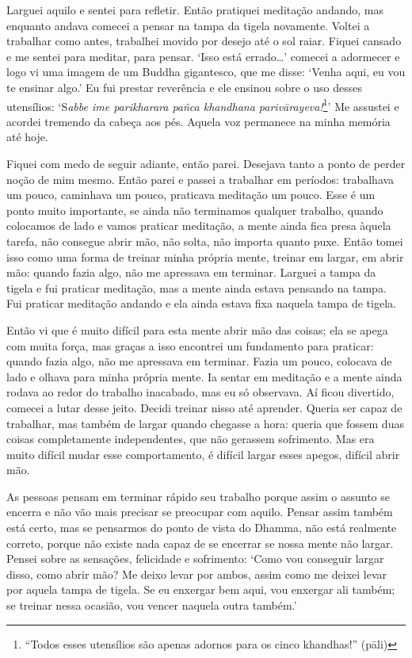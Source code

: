 Larguei aquilo e sentei para refletir. Então pratiquei meditação
andando, mas enquanto andava comecei a pensar na tampa da tigela
novamente. Voltei a trabalhar como antes, trabalhei movido por desejo
até o sol raiar. Fiquei cansado e me sentei para meditar, para pensar.
`Isso está errado\ldots{}' comecei a adormecer e logo vi uma imagem de
um Buddha gigantesco, que me disse: `Venha aqui, eu vou te ensinar
algo.' Eu fui prestar reverência e ele ensinou sobre o uso desses
utensílios: `S\emph{abbe ime parikharara pañca khandhana
parivārayeva!}\footnote{``Todos esses utensílios são apenas adornos para
  os cinco khandhas!'' (pāli)}' Me assustei e acordei tremendo da cabeça
aos pés. Aquela voz permanece na minha memória até hoje.

Fiquei com medo de seguir adiante, então parei. Desejava tanto a ponto
de perder noção de mim mesmo. Então parei e passei a trabalhar em
períodos: trabalhava um pouco, caminhava um pouco, praticava meditação
um pouco. Esse é um ponto muito importante, se ainda não terminamos
qualquer trabalho, quando colocamos de lado e vamos praticar meditação,
a mente ainda fica presa àquela tarefa, não consegue abrir mão, não
solta, não importa quanto puxe. Então tomei isso como uma forma de
treinar minha própria mente, treinar em largar, em abrir mão: quando
fazia algo, não me apressava em terminar. Larguei a tampa da tigela e
fui praticar meditação, mas a mente ainda estava pensando na tampa. Fui
praticar meditação andando e ela ainda estava fixa naquela tampa de
tigela.

Então vi que é muito difícil para esta mente abrir mão das coisas; ela
se apega com muita força, mas graças a isso encontrei um fundamento para
praticar: quando fazia algo, não me apressava em terminar. Fazia um
pouco, colocava de lado e olhava para minha própria mente. Ia sentar em
meditação e a mente ainda rodava ao redor do trabalho inacabado, mas eu
só observava. Aí ficou divertido, comecei a lutar desse jeito. Decidi
treinar nisso até aprender. Queria ser capaz de trabalhar, mas também de
largar quando chegasse a hora: queria que fossem duas coisas
completamente independentes, que não gerassem sofrimento. Mas era muito
difícil mudar esse comportamento, é difícil largar esses apegos, difícil
abrir mão.

As pessoas pensam em terminar rápido seu trabalho porque assim o assunto
se encerra e não vão mais precisar se preocupar com aquilo. Pensar assim
também está certo, mas se pensarmos do ponto de vista do Dhamma, não
está realmente correto, porque não existe nada capaz de se encerrar se
nossa mente não largar. Pensei sobre as sensações, felicidade e
sofrimento: `Como vou conseguir largar disso, como abrir mão? Me deixo
levar por ambos, assim como me deixei levar por aquela tampa de tigela.
Se eu enxergar bem aqui, vou enxergar ali também; se treinar nessa
ocasião, vou vencer naquela outra também.'

